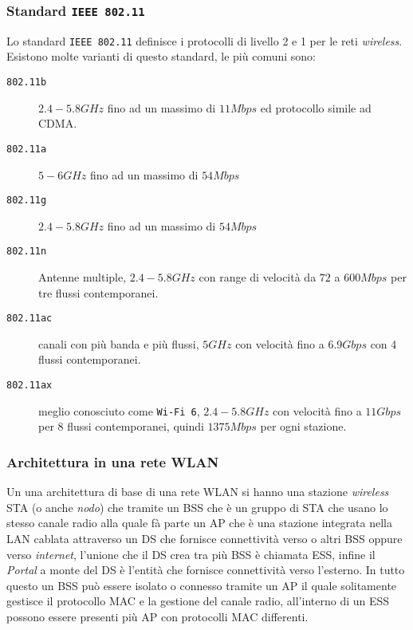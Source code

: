         \subsubsection{Standard \texttt{\Acrshort*{IEEE} 802.11}}
            Lo standard \texttt{\Acrshort*{IEEE} 802.11} definisce i protocolli di livello 2 e 1 per le reti \textit{wireless}. Esistono molte varianti di questo standard, le più comuni sono:
            \begin{description}
                \item[\texttt{802.11b}] $2.4-5.8GHz$ fino ad un massimo di $11Mbps$ ed protocollo simile ad \Acrshort*{CDMA}.
                \item[\texttt{802.11a}] $5-6GHz$ fino ad un massimo di $54Mbps$
                \item[\texttt{802.11g}] $2.4-5.8GHz$ fino ad un massimo di $54Mbps$
                \item[\texttt{802.11n}] Antenne multiple, $2.4-5.8GHz$ con range di velocità da $72$ a $600Mbps$ per tre flussi contemporanei.
                \item[\texttt{802.11ac}] canali con più banda e più flussi, $5GHz$ con velocità fino a $6.9Gbps$ con 4 flussi contemporanei.
                \item[\texttt{802.11ax}] meglio conosciuto come \texttt{\Acrshort*{Wi-Fi} 6}, $2.4-5.8GHz$ con velocità fino a $11Gbps$ per 8 flussi contemporanei, quindi $1375Mbps$ per ogni stazione.
            \end{description}
        \subsubsection{Architettura in una rete \Acrshort*{WLAN}}
            Un una architettura di base di una rete \Acrshort*{WLAN} si hanno una stazione \textit{wireless} \acrfull*{STA} (o anche \textit{nodo}) che tramite un \acrfull*{BSS} che è un gruppo di \Acrshort*{STA} che usano lo stesso canale radio alla quale fà parte un \acrfull*{AP} che è una stazione integrata nella \Acrshort*{LAN} cablata attraverso un \acrfull*{DS} che fornisce connettività verso o altri \Acrshort*{BSS} oppure verso \textit{internet}, l'unione che il \Acrshort*{DS} crea tra più \Acrshort*{BSS} è chiamata \acrfull*{ESS}, infine il \textit{Portal} a monte del \Acrshort*{DS} è l'entità che fornisce connettività verso l'esterno.\newline
            In tutto questo un \Acrshort*{BSS} può essere isolato o connesso tramite un \Acrshort*{AP} il quale solitamente gestisce il protocollo \Acrshort*{MAC} e la gestione del canale radio, all'interno di un \Acrshort*{ESS} possono essere presenti più \Acrshort*{AP} con protocolli \Acrshort*{MAC} differenti.
